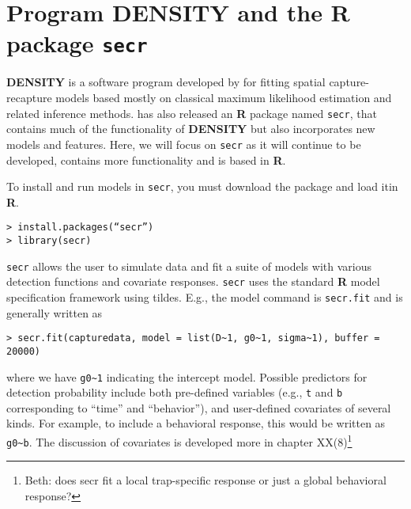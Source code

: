 \section{Program DENSITY and the R package \mbox{\tt secr} }
\label{mle.sec.secr}


{\bf DENSITY} is a software program developed by \citet{efford:2004}
for fitting spatial capture-recapture models based mostly on classical
maximum likelihood estimation and related inference methods.
\citet{efford:2011} has also released an {\bf R} package named
\mbox{\tt secr}, that contains much of the functionality of {\bf
  DENSITY} but also incorporates new models and features.  Here, we
will focus on \mbox{\tt secr} as it will continue to be developed,
contains more functionality and is based in {\bf R}.


 To install
and run models in \mbox{\tt secr}, you must download the package and load itin
{\bf R}.
\begin{verbatim}
> install.packages(“secr”)
> library(secr)
\end{verbatim}
\mbox{\tt secr} allows the user to simulate data and fit a suite of models with
various detection functions and covariate responses.  \mbox{\tt secr}
uses the
standard {\bf R} model specification framework using tildes. E.g., the model
command is \mbox{\tt secr.fit} and is generally written as
\begin{verbatim}
> secr.fit(capturedata, model = list(D~1, g0~1, sigma~1), buffer = 20000)
\end{verbatim}
where we have \verb#g0~1# indicating the intercept model. 
 Possible predictors for detection probability include both
pre-defined variables (e.g., \mbox{\tt t} and \mbox{\tt b}
corresponding to ``time'' and 
``behavior''), and user-defined covariates of several kinds. 
For example, to include a behavioral response, this would be written
as \verb#g0~b#.
The discussion of covariates is developed more in chapter XX(8)\footnote{Beth:
  does secr fit a local trap-specific response or just a global
  behavioral response?}


